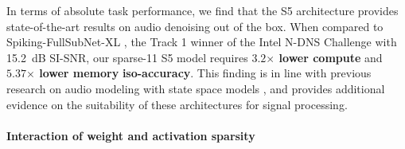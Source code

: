 In terms of absolute task performance, we find that the S5 architecture provides state-of-the-art results on audio denoising out of the box.
When compared to Spiking-FullSubNet-XL \cite{10605482}, the Track 1 winner of the Intel N-DNS Challenge with \qty{15.2}{\dB} SI-SNR, our sparse-\qty{11}{} S5 model requires \textbf{$\mathbf{3.2}\boldsymbol{\times}$ lower compute} and \textbf{$\mathbf{5.37}\boldsymbol{\times}$ lower memory} \textbf{iso-accuracy}.
This finding is in line with previous research on audio modeling with state space models \cite{DBLP:conf/icml/GoelGDR22}, and provides additional evidence on the suitability of these architectures for signal processing.
%
%
% 
%



\paragraph{Interaction of weight and activation sparsity}

